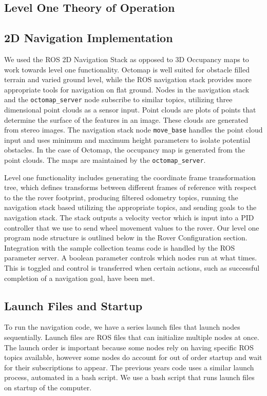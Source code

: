\documentclass[10pt, oneside,onecolumn]{IEEEtran}
\begin{document}
\begin{titlepage}
\section{Level One Theory of Operation}
\subsection{2D Navigation Implementation}
We used the ROS 2D Navigation Stack as opposed to 3D Occupancy maps to work towards level one functionality. Octomap is well suited for obstacle filled terrain and varied ground level, while the ROS navigation stack provides more appropriate tools for navigation on flat ground. Nodes in the navigation stack and the \texttt{octomap\_server} node subscribe to similar topics, utilizing three dimensional point clouds as a sensor input. Point clouds are plots of points that determine the surface of the features in an image. These clouds are generated from stereo images. The navigation stack node \texttt{move\_base} handles the point cloud input and uses minimum and maximum height parameters to isolate potential obstacles. In the case of Octomap, the occupancy map is generated from the point clouds. The maps are maintained by the \texttt{octomap\_server}.

Level one functionality includes generating the coordinate frame transformation tree, which defines transforms between different frames of reference with respect to the the rover footprint, producing filtered odometry topics, running the navigation stack based utilizing the appropriate topics, and sending goals to the navigation stack. The stack outputs a velocity vector which is input into a PID controller that we use to send wheel movement values to the rover. Our level one program node structure is outlined below in the Rover Configuration section. Integration with the sample collection teams code is handled by the ROS parameter server. A boolean parameter controls which nodes run at what times. This is toggled and control is transferred when certain actions, such as successful completion of a navigation goal, have been met. 

\subsection{Launch Files and Startup}
To run the navigation code, we have a series launch files that launch nodes sequentially. Launch files are ROS files that can initialize multiple nodes at once. The launch order is important because some nodes rely on having specific ROS topics available, however some nodes do account for out of order startup and wait for their subscriptions to appear. The previous years code uses a similar launch process, automated in a bash script. We use a bash script that runs launch files on startup of the computer.


\end{titlepage}
\end{document}
